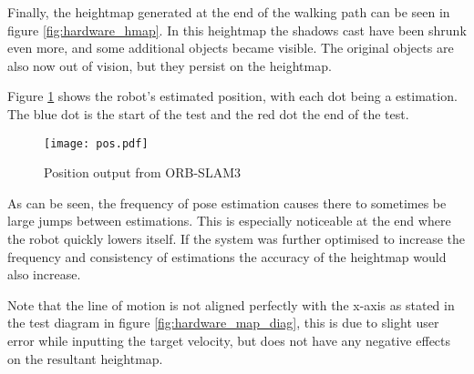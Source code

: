         \noindent
        Finally, the heightmap generated at the end of the walking path can be seen in figure \ref{fig:hardware_hmap}. In this heightmap the shadows cast
        have been shrunk even more, and some additional objects became visible. The original objects are also now out of vision, but they persist on the heightmap. 

        Figure \ref{fig:hardware_pos} shows the robot's estimated position, with each dot being a estimation. The blue dot is the start of the test and the red dot the end of the test.
        \begin{figure}[h]
            \centering
            \texttt{[image: pos.pdf]}
            \caption{Position output from ORB-SLAM3}
            \label{fig:hardware_pos}
        \end{figure}

        \noindent
        As can be seen, the frequency of pose estimation causes there to sometimes be large jumps between estimations. This is especially noticeable at the end where the
        robot quickly lowers itself. If the system was further optimised to increase the frequency and consistency of estimations the accuracy of the heightmap
        would also increase.

        Note that the line of motion is not aligned perfectly with the x-axis as stated in the test diagram in figure \ref{fig:hardware_map_diag}, this is due to slight user
        error while inputting the target velocity, but does not have any negative effects on the resultant heightmap.
